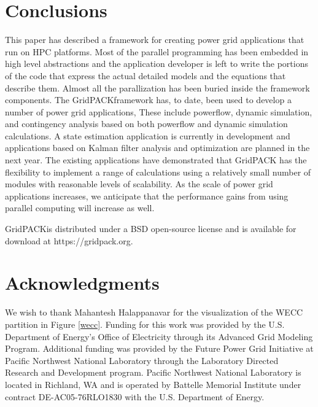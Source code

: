 \documentclass[preprint]{acm_proc_article-sp}
\begin{document}
\section{Conclusions}
This paper has described a framework for creating power grid applications that
run on HPC platforms. Most of the parallel programming has been embedded in high
level abstractions and the application developer is left to write the portions
of the code that express the actual detailed models and the equations that describe
them. Almost all the parallization has been buried inside the
framework components. The GridPACK\texttrademark framework has, to date, been
used to develop a number of power grid applications, These include powerflow,
dynamic simulation, and contingency analysis based on both powerflow and dynamic
simulation calculations. A state estimation application is currently in
development and applications based on Kalman filter analysis and optimization
are planned in the next year. The existing applications have demonstrated that
GridPACK has the flexibility to implement a range of calculations using a
relatively small number of modules with reasonable levels of scalability. As the
scale of power grid applications increases, we anticipate that the performance
gains from using parallel computing will increase as well.

GridPACK\texttrademark is distributed under a BSD open-source license and is
available for download at https://gridpack.org.

\section{Acknowledgments}
We wish to thank Mahantesh Halappanavar for the visualization of the WECC
partition in Figure \ref{wecc}.
Funding for this work was provided by the U.S. Department of Energy's Office of
Electricity through its Advanced Grid Modeling Program.
Additional funding was provided by the Future Power Grid Initiative at Pacific
Northwest National Laboratory through the Laboratory Directed Research and
Development program.
Pacific Northwest National Laboratory is located in Richland, WA and is operated
by Battelle Memorial Institute under contract DE-AC05-76RLO1830 with the U.S.
Department of Energy.



\end{document}
